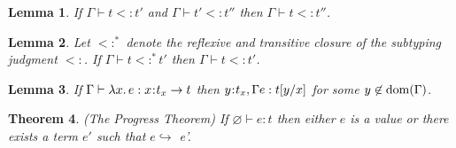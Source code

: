 \documentclass[11pt]{article}
\newtheorem{theorem}{Theorem}%
\newtheorem{lemma}[theorem]{Lemma}
\newcommand{\bind}{\hspace{0.05em}{:}\hspace{0.05em}} %
\newcommand{\functype}[3]{#1\bind #2 \rightarrow #3}
\newcommand{\dom}[1]{{\rm dom}(#1)}
\begin{document}
\begin{lemma}\label{sub-trans}
If $\Gamma \vdash t <: t'$ and $\Gamma \vdash t' <: t''$ then $\Gamma \vdash t <: t''$.
\end{lemma}

\begin{lemma}\label{sub-closure}
Let $<:^*$ denote the reflexive and transitive closure of the subtyping judgment $<:$. If $\Gamma \vdash t <:^* t'$ then $\Gamma \vdash t <: t'$.
\end{lemma}

\begin{lemma}\label{invert-app}
If $\Gamma \vdash \lambda x.\, e : \functype{x}{t_x}{t}$ then $y\bind t_x, \Gamma e : t[y/x]$ for some $y\not\in\dom{\Gamma}$.
\end{lemma}

\begin{theorem}\label{progress}
(The Progress Theorem) If $\varnothing \vdash e : t$ then either $e$ is a value or there exists a term $e'$ such that $e \hookrightarrow$ e'.
\end{theorem}
\end{document}
